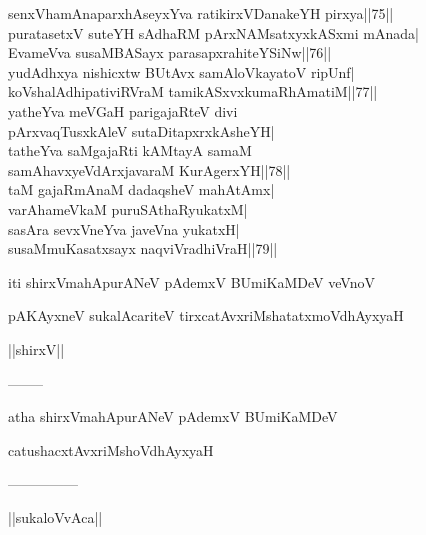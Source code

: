\documentclass{article}
\begin{document}
senxVhamAnaparxhAseyxYva ratikirxVDanakeYH pirxya||75||\\
puratasetxV suteYH sAdhaRM pArxNAMsatxyxkASxmi mAnada|\\
EvameVva susaMBASayx parasapxrahiteYSiNw||76||\\
yudAdhxya nishicxtw BUtAvx samAloVkayatoV ripUnf|\\
koVshalAdhipativiRVraM tamikASxvxkumaRhAmatiM||77||\\
yatheYva meVGaH parigajaRteV divi\\
pArxvaqTusxkAleV sutaDitapxrxkAsheYH|\\
tatheYva saMgajaRti kAMtayA samaM\\
samAhavxyeVdArxjavaraM KurAgerxYH||78||\\
taM gajaRmAnaM dadaqsheV mahAtAmx|\\
varAhameVkaM puruSAthaRyukatxM|\\
sasAra sevxVneYva javeVna yukatxH|\\
susaMmuKasatxsayx naqviVradhiVraH||79||

\begin{center}
iti shirxVmahApurANeV pAdemxV BUmiKaMDeV veVnoV
\end{center}

\begin{center}
pAKAyxneV sukalAcariteV tirxcatAvxriMshatatxmoVdhAyxyaH
\end{center}

\begin{center}
||shirxV||
\end{center}

\begin{center}
--------
\end{center}

\begin{center}
atha shirxVmahApurANeV pAdemxV BUmiKaMDeV
\end{center}

\begin{center}
catushacxtAvxriMshoVdhAyxyaH
\end{center}

\begin{center}
---------------
\end{center}

\begin{center}
||sukaloVvAca||
\end{center}
\end{document}
